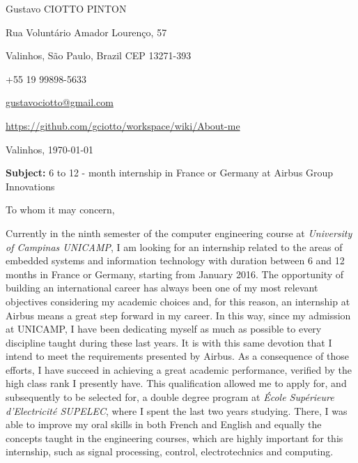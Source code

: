 \documentclass[12pt, a4paper]{article}
\begin{document}
\pagestyle{empty} 

Gustavo CIOTTO PINTON

Rua Voluntário Amador Lourenço, 57

Valinhos, São Paulo, Brazil CEP 13271-393

+55 19 99898-5633

 \url{gustavociotto@gmail.com}

\url{https://github.com/gciotto/workspace/wiki/About-me}
\begin{flushright}
\vspace{-12pt}
Valinhos,  \today





\end{flushright}

\textbf{Subject:} 6 to 12 - month internship in France or Germany at Airbus
Group Innovations 

\vspace{12pt} 

To whom it may concern, 

\vspace{12pt}
Currently in the ninth semester of the computer engineering course at
\textit{University of Campinas UNICAMP}, I am looking for an internship related
to the areas of embedded systems and information technology with duration
between 6 and 12 months in France or Germany, starting from January 2016. The
opportunity of building an international career has always been one of my most
relevant objectives considering my academic choices and, for this reason, an
internship at Airbus means a great step forward in my career. In this
way, since my admission at UNICAMP, I have been dedicating myself as much as possible to every
discipline taught during these last years. It is with this same devotion that I
intend to meet the requirements presented by Airbus. As a consequence of those
efforts, I have succeed in achieving a great academic performance, verified by
the high class rank I presently have. This qualification allowed me to apply
for, and subsequently to be selected for, a double degree program at
\textit{École Supérieure d'Electricité SUPELEC}, where I spent the last two
years studying. There, I was able to improve my oral skills in both French and English and
equally the concepts taught in the engineering courses, which are highly
important for this internship, such as signal processing, control,
electrotechnics and computing.
\end{document}
